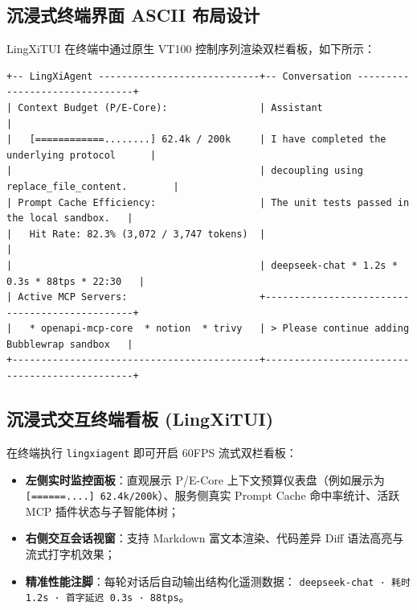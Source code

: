 \documentclass[11pt,a4paper]{article}
\begin{document}
\subsection{沉浸式终端界面 ASCII 布局设计}
LingXiTUI 在终端中通过原生 VT100 控制序列渲染双栏看板，如下所示：
\begin{lstlisting}
+-- LingXiAgent ----------------------------+-- Conversation -------------------------------+
| Context Budget (P/E-Core):                | Assistant                                     |
|   [============........] 62.4k / 200k     | I have completed the underlying protocol      |
|                                           | decoupling using replace_file_content.        |
| Prompt Cache Efficiency:                  | The unit tests passed in the local sandbox.   |
|   Hit Rate: 82.3% (3,072 / 3,747 tokens)  |                                               |
|                                           | deepseek-chat * 1.2s * 0.3s * 88tps * 22:30   |
| Active MCP Servers:                       +-----------------------------------------------+
|   * openapi-mcp-core  * notion  * trivy   | > Please continue adding Bubblewrap sandbox   |
+-------------------------------------------+-----------------------------------------------+
\end{lstlisting}

\subsection{沉浸式交互终端看板 (LingXiTUI)}
在终端执行 \texttt{lingxiagent} 即可开启 60FPS 流式双栏看板：
\begin{itemize}
    \item \textbf{左侧实时监控面板}：直观展示 P/E-Core 上下文预算仪表盘（例如展示为 \texttt{[======....] 62.4k/200k}）、服务侧真实 Prompt Cache 命中率统计、活跃 MCP 插件状态与子智能体树；
    \item \textbf{右侧交互会话视窗}：支持 Markdown 富文本渲染、代码差异 Diff 语法高亮与流式打字机效果；
    \item \textbf{精准性能注脚}：每轮对话后自动输出结构化遥测数据：
    \texttt{deepseek-chat · 耗时 1.2s · 首字延迟 0.3s · 88tps}。
\end{itemize}
\end{document}

